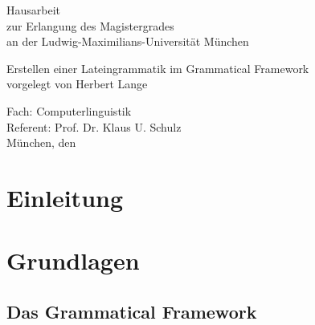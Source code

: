 \documentclass[fontsize=12pt,abstract=on,titlepage,bibliography=totoc,ngerman,listof=totoc]{scrreprt}
\begin{document}
\setcounter{tocdepth}{2}
\date{30.9.2013}
\makeatletter
\begin{titlepage}
{\sffamily
  \begin{center}
    \vspace{4cm}
    \begin{huge}
      Hausarbeit \\
      zur Erlangung des Magistergrades \\
      an der Ludwig-Maximilians-Universität München \\[3cm]
    \end{huge}
    {\Huge Erstellen einer Lateingrammatik im Grammatical Framework \\[4cm] }
    {\LARGE vorgelegt von Herbert Lange \\[4cm] }
  \end{center}
  \parindent0mm
  \begin{huge} 
    Fach: Computerlinguistik  \\[0.3cm]
    Referent: Prof. Dr. Klaus U. Schulz \\[0.3cm]
    München, den \@date 
  \end{huge}
}
\end{titlepage}
\begin{abstract}
In dieser Arbeit sollen an einem konkreten Beispiel die nötigen Schritte gezeigt werden, um eine computergestützte Grammatik für eine natürliche Sprache zu entwerfen. Am Beispiel der lateinischen Sprache wird gezeigt, wie ein Lexikon, ein Morphologiesystem und eine Syntax implementiert werden kann, die sich in ein größeres, multilinguales Grammatiksystem einfügen lässt. Dadurch können zum einen in der implementierten Sprache Sätze einfach geparsed werden, aber auch in jede andere im System vorhandene Sprache übersetzt werden können. Gezeigt wird ein rein regelbasierter Ansatz der sich von den statistischen Methoden durch seine Striktheit und Beschränktheit, aber auch durch seine Zuverlässigkeit abhebt.
\end{abstract}
\makeatother
\tableofcontents
\clearpage
\setcounter{page}{1}
\chapter{Einleitung}
\label{chap:einleitung}

\pagebreak
\chapter{Grundlagen}
\label{chap:grundlagen}
\section{Das Grammatical Framework}
\label{sec:gf}

\pagebreak
\FloatBarrier
\end{document}
